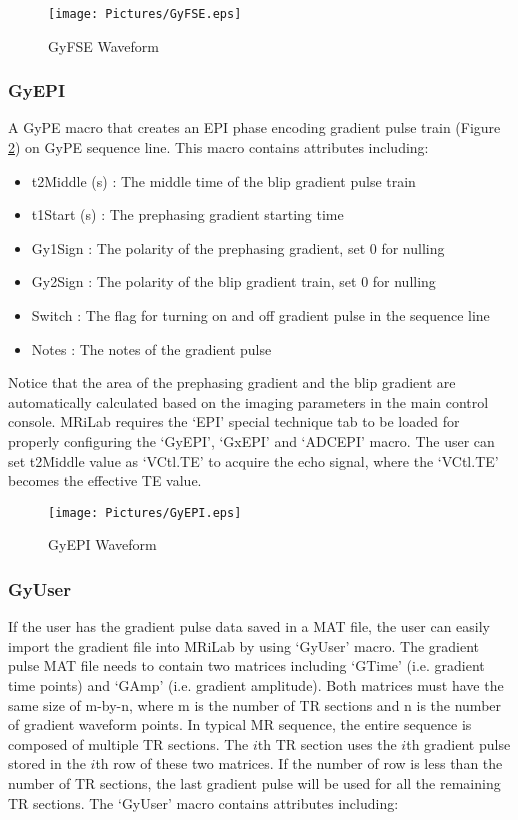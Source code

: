 \documentclass{book}%
\begin{document}
\begin{figure}[htbp]
	\centering
		\texttt{[image: Pictures/GyFSE.eps]}
	\caption{GyFSE Waveform}
	\label{fig:GyFSE}
\end{figure}

\subsubsection{GyEPI}

A GyPE macro that creates an EPI phase encoding gradient pulse train (Figure \ref{fig:GyEPI}) on GyPE sequence line. This macro contains attributes including:

\begin{itemize}
	\item t2Middle (s) : The middle time of the blip gradient pulse train
	\item t1Start (s) : The prephasing gradient starting time
	\item Gy1Sign : The polarity of the prephasing gradient, set 0 for nulling
	\item Gy2Sign : The polarity of the blip gradient train, set 0 for nulling
	\item Switch : The flag for turning on and off gradient pulse in the sequence line
	\item Notes : The notes of the gradient pulse 
\end{itemize}

Notice that the area of the prephasing gradient and the blip gradient are automatically calculated based on the imaging parameters in the main control console. MRiLab requires the `EPI' special technique tab to be loaded for properly configuring the `GyEPI', `GxEPI' and `ADCEPI' macro. The user can set t2Middle value as `VCtl.TE' to acquire the echo signal, where the `VCtl.TE' becomes the effective TE value.

\begin{figure}[htbp]
	\centering
		\texttt{[image: Pictures/GyEPI.eps]}
	\caption{GyEPI Waveform}
	\label{fig:GyEPI}
\end{figure}


\subsubsection{GyUser}

If the user has the gradient pulse data saved in a MAT file, the user can easily import the gradient file into MRiLab by using `GyUser' macro. The gradient pulse MAT file needs to contain two matrices including `GTime' (i.e. gradient time points) and `GAmp' (i.e. gradient amplitude). Both matrices must have the same size of m-by-n, where m is the number of TR sections and n is the number of gradient waveform points. In typical MR sequence, the entire sequence is composed of multiple TR sections. The $i$th TR section uses the $i$th gradient pulse stored in the $i$th row of these two matrices. If the number of row is less than the number of TR sections, the last gradient pulse will be used for all the remaining TR sections. The `GyUser' macro contains attributes including:
\end{document}
